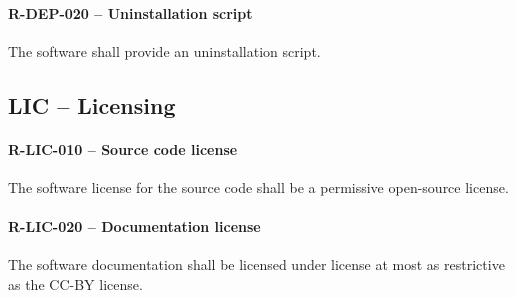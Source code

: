 \paragraph{R-DEP-020 -- Uninstallation script}
The software shall provide an uninstallation script.

\subsection{LIC -- Licensing}
\paragraph{R-LIC-010 -- Source code license}
The software license for the source code shall be a permissive open-source
license.

\paragraph{R-LIC-020 -- Documentation license}
The software documentation shall be licensed under license at most as
restrictive as the CC-BY license.